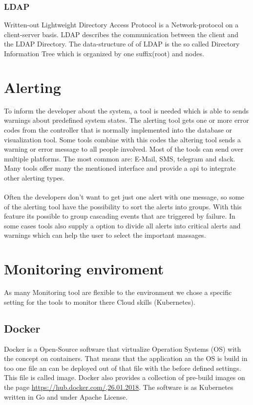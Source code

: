 \subsubsection{LDAP}
Written-out Lightweight Directory Access Protocol is a Network-protocol on a client-server basis. LDAP describes the communication between the client and the LDAP Directory. The data-structure of of LDAP is the so called Directory Information Tree which is organized by one suffix(root) and nodes.  

\section{Alerting}
To inform the developer about the system, a tool is needed which is able to sends warnings about predefined system states.
The alerting tool gets one or more error codes from the controller that is normally implemented into the database or visualization tool. Some tools combine with this codes the altering tool sends a warning or error message to all people involved. Most of the tools can send over multiple platforms. The most common are: E-Mail, SMS, telegram and slack. Many tools offer many the mentioned interface and provide a api to integrate other alerting types.\\
\\
Often the developers don’t want to get just one alert with one message, so some of the alerting tool have the possibility to sort the alerts into groups. With this feature its possible to group cascading events that are triggered by failure. In some cases tools also supply a option to divide all alerts into critical alerts and warnings which can help the user to select the important massages.  

\section{Monitoring enviroment}
As many Monitoring tool are flexible to the environment we chose a specific setting for the tools to monitor there Cloud skills (Kubernetes). \cite{Vohra2016} 
\subsection{Docker}
Docker is a Open-Source software that virtualize Operation Systems (OS) with the concept on containers. That means that the application an the OS is build in too one file an can be deployed out of that file with the before defined settings. This file is called image. Docker also provides a collection of pre-build images on the page \url{https://hub.docker.com/,26.01.2018}. The software is as Kubernetes written in Go and under Apache License.

